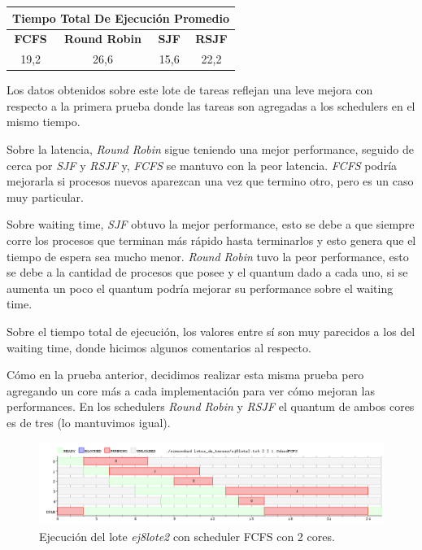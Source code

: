 \begin{center}
	\begin{tabular}{|c|c|c|c|}
		\hline
		\multicolumn{4}{|c|}{\large{\textbf{Tiempo Total De Ejecución Promedio}}} \\
		\hline
		\textbf{FCFS} & \textbf{Round Robin} & \textbf{SJF} & \textbf{RSJF} \\
		\hline
		19,2 & 26,6 & 15,6 & 22,2 \\
		\hline
	\end{tabular}
\end{center}

Los datos obtenidos sobre este lote de tareas reflejan una leve mejora con respecto a la primera prueba donde las tareas son agregadas a los schedulers en el mismo tiempo.

Sobre la latencia, \emph{Round Robin} sigue teniendo una mejor performance, seguido de cerca por \emph{SJF} y \emph{RSJF} y, \emph{FCFS} se mantuvo con la peor latencia. \emph{FCFS} podría mejorarla si procesos nuevos aparezcan una vez que termino otro, pero es un caso muy particular.

Sobre waiting time, \emph{SJF} obtuvo la mejor performance, esto se debe a que siempre corre los procesos que terminan más rápido hasta terminarlos y esto genera que el tiempo de espera sea mucho menor. \emph{Round Robin} tuvo la peor performance, esto se debe a la cantidad de procesos que posee y el quantum dado a cada uno, si se aumenta un poco el quantum podría mejorar su performance sobre el waiting time.

Sobre el tiempo total de ejecución, los valores entre sí son muy parecidos a los del waiting time, donde hicimos algunos comentarios al respecto.

Cómo en la prueba anterior, decidimos realizar esta misma prueba pero agregando un core más a cada implementación para ver cómo mejoran las performances. En los schedulers \emph{Round Robin} y \emph{RSJF} el quantum de ambos cores es de tres (lo mantuvimos igual).

\begin{figure}[!h]
	\begin{center}
		\includegraphics[width=500px]{imagenes/ej8_prueba2_fcfs2.png}
		\caption{Ejecución del lote \emph{ej8lote2} con scheduler FCFS con 2 cores.}
		\label{fig:grafico_ej8_prueba2_fcfs2}
	\end{center}
\end{figure}


